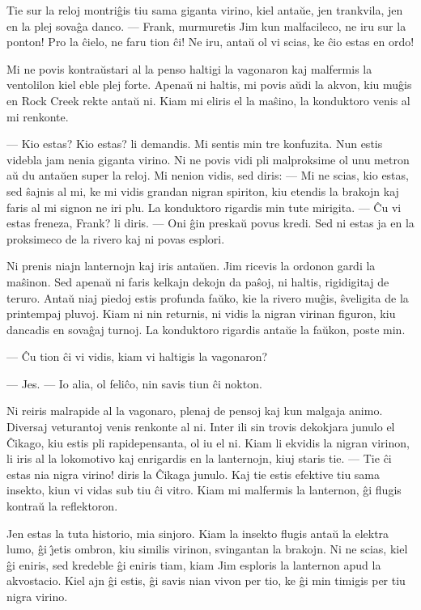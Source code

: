    Tie sur la reloj montri\^gis tiu sama giganta virino, kiel anta\u ue,
jen tran\-kvi\-la, jen en la plej sova\^ga danco. --- Frank,
murmuretis Jim kun malfacileco, ne iru sur la ponton! Pro la
\^cielo, ne faru tion \^ci! Ne iru, anta\u u ol vi scias, ke \^cio
estas en ordo!

   Mi ne povis kontra\u ustari al la penso haltigi la vagonaron kaj
malfermis la ventolilon kiel eble plej forte. Apena\u u ni haltis,
mi povis a\u udi la akvon, kiu mu\^gis en Rock Creek rekte anta\u u
ni. Kiam mi eliris el la ma\^sino, la konduktoro venis al mi
renkonte.

 --- Kio estas? Kio estas? li demandis. Mi sentis min tre konfuzita.
Nun estis videbla jam nenia giganta virino. Ni ne povis vidi pli
malproksime ol unu metron a\u u du anta\u uen super la reloj. Mi
nenion vidis, sed diris: --- Mi ne scias, kio estas, sed \^sajnis al
mi, ke mi vidis grandan nigran spiriton, kiu etendis la brakojn kaj
faris al mi signon ne iri plu. La konduktoro rigardis min tute
mirigita. --- \^Cu vi estas freneza, Frank? li diris. --- Oni \^gin
preska\u u povus kredi. Sed ni estas ja en la proksimeco de la
rivero kaj ni povas esplori.

   Ni prenis niajn lanternojn kaj iris anta\u uen. Jim ricevis la ordonon
gardi la ma\^sinon. Sed apena\u u ni faris kelkajn dekojn da
pa\^soj, ni haltis, rigidigitaj de teruro. Anta\u u niaj piedoj
estis profunda fa\u uko, kie la rivero mu\^gis, \^sveligita de la
printempaj pluvoj. Kiam ni nin returnis, ni vidis la nigran virinan
figuron, kiu dancadis en sova\^gaj turnoj. La konduktoro rigardis
anta\u ue la fa\u ukon, poste min.

 --- \^Cu tion \^ci vi vidis, kiam vi haltigis la vagonaron?

 --- Jes. --- Io alia, ol feli\^co, nin savis tiun \^ci nokton.

   Ni reiris malrapide al la vagonaro, plenaj de pensoj kaj kun malgaja
animo. Diversaj veturantoj venis renkonte al ni. Inter ili sin
trovis dekokjara junulo el \^Cikago, kiu estis pli rapidepensanta,
ol iu el ni. Kiam li ekvidis la nigran virinon, li iris al la
lokomotivo kaj enrigardis en la lanternojn, kiuj staris tie. --- Tie
\^ci estas nia nigra virino! diris la \^Cikaga junulo. Kaj tie estis
efektive tiu sama insekto, kiun vi vidas sub tiu \^ci vitro. Kiam mi
malfermis la lanternon, \^gi flugis kontra\u u la reflektoron.

   Jen estas la tuta historio, mia sinjoro. Kiam la insekto flugis
anta\u u la elektra lumo, \^gi \^{\j}etis ombron, kiu similis
virinon, svingantan la brakojn. Ni ne scias, kiel \^gi eniris, sed
kredeble \^gi eniris tiam, kiam Jim esploris la lanternon apud la
akvostacio. Kiel ajn \^gi estis, \^gi savis nian vivon per tio, ke
\^gi min timigis per tiu nigra virino.

